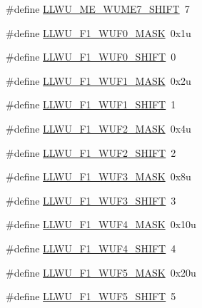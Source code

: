 \begin{DoxyCompactItemize}
\item 
\#define \hyperlink{group___l_l_w_u___register___masks_ga1676e95c4d2477005c4c37ee97b45db3}{L\+L\+W\+U\+\_\+\+M\+E\+\_\+\+W\+U\+M\+E7\+\_\+\+S\+H\+I\+FT}~7
\item 
\#define \hyperlink{group___l_l_w_u___register___masks_ga1308a2e0d967a81b7fc32af6816cb532}{L\+L\+W\+U\+\_\+\+F1\+\_\+\+W\+U\+F0\+\_\+\+M\+A\+SK}~0x1u
\item 
\#define \hyperlink{group___l_l_w_u___register___masks_ga6a004e1e5a54356cf5b70d9f17b96afc}{L\+L\+W\+U\+\_\+\+F1\+\_\+\+W\+U\+F0\+\_\+\+S\+H\+I\+FT}~0
\item 
\#define \hyperlink{group___l_l_w_u___register___masks_ga3513d59cf672e1dfd8884672b57c879b}{L\+L\+W\+U\+\_\+\+F1\+\_\+\+W\+U\+F1\+\_\+\+M\+A\+SK}~0x2u
\item 
\#define \hyperlink{group___l_l_w_u___register___masks_gadfac3bafc6a624b27f059e3d9cf3a899}{L\+L\+W\+U\+\_\+\+F1\+\_\+\+W\+U\+F1\+\_\+\+S\+H\+I\+FT}~1
\item 
\#define \hyperlink{group___l_l_w_u___register___masks_gabc46629018d0f2eb7a39896eb5225933}{L\+L\+W\+U\+\_\+\+F1\+\_\+\+W\+U\+F2\+\_\+\+M\+A\+SK}~0x4u
\item 
\#define \hyperlink{group___l_l_w_u___register___masks_gab99e1778fd26ccd69f31a56d94709e41}{L\+L\+W\+U\+\_\+\+F1\+\_\+\+W\+U\+F2\+\_\+\+S\+H\+I\+FT}~2
\item 
\#define \hyperlink{group___l_l_w_u___register___masks_ga7c81d1a3309d56f967355042ac08c299}{L\+L\+W\+U\+\_\+\+F1\+\_\+\+W\+U\+F3\+\_\+\+M\+A\+SK}~0x8u
\item 
\#define \hyperlink{group___l_l_w_u___register___masks_gada64305bc36dde8d293f511de2183d0c}{L\+L\+W\+U\+\_\+\+F1\+\_\+\+W\+U\+F3\+\_\+\+S\+H\+I\+FT}~3
\item 
\#define \hyperlink{group___l_l_w_u___register___masks_ga9dad2dc81874baa09dac37d10cc4781d}{L\+L\+W\+U\+\_\+\+F1\+\_\+\+W\+U\+F4\+\_\+\+M\+A\+SK}~0x10u
\item 
\#define \hyperlink{group___l_l_w_u___register___masks_ga4ce65dd6db7f89bd5e6f0fb7df47a399}{L\+L\+W\+U\+\_\+\+F1\+\_\+\+W\+U\+F4\+\_\+\+S\+H\+I\+FT}~4
\item 
\#define \hyperlink{group___l_l_w_u___register___masks_ga2ba67283979e853e1601bd15a534523e}{L\+L\+W\+U\+\_\+\+F1\+\_\+\+W\+U\+F5\+\_\+\+M\+A\+SK}~0x20u
\item 
\#define \hyperlink{group___l_l_w_u___register___masks_ga56f1fa2e4a277de750be421a3b35df87}{L\+L\+W\+U\+\_\+\+F1\+\_\+\+W\+U\+F5\+\_\+\+S\+H\+I\+FT}~5
\item 

\end{DoxyCompactItemize}
